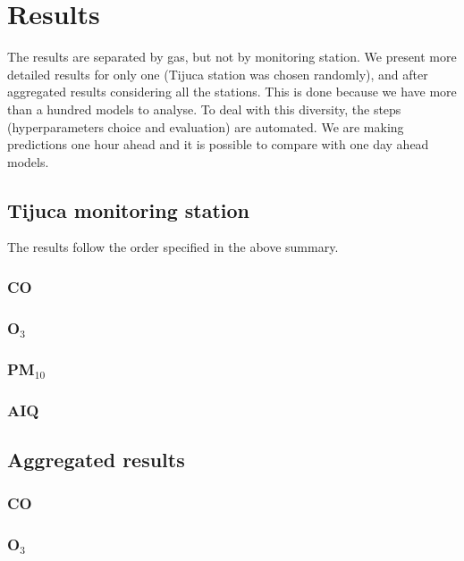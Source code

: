 \section{Results}
\label{sec:results}

The results are separated by gas, but not by monitoring station. We present
more detailed results for only one (Tijuca station was chosen randomly), and after aggregated results
considering all the stations. This is done because we have more than
a hundred models to analyse. To deal with this diversity, the steps
(hyperparameters choice and evaluation) are automated. We are
making predictions one hour ahead and it is possible to compare with one day
ahead models. 

\subsection{Tijuca monitoring station}

The results follow the order specified in the above summary. 

\subsubsection{CO}

\subsubsection{O\texorpdfstring{$_3$}{3}}

\subsubsection{PM\texorpdfstring{$_{10}$}{10}}

\subsubsection{AIQ}

\subsection{Aggregated results}

\subsubsection{CO}

\subsubsection{O\texorpdfstring{$_3$}{3}}

